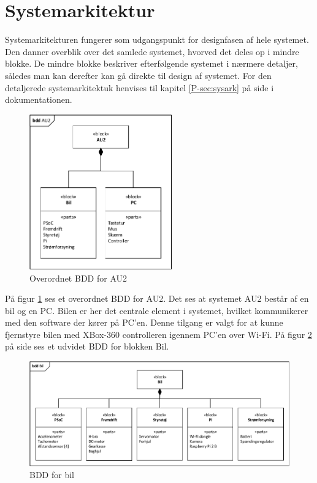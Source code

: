 \section{Systemarkitektur} \label{ch:Systemarkitektur}

Systemarkitekturen fungerer som udgangspunkt for designfasen af hele systemet.
Den danner overblik over det samlede systemet, hvorved det deles op i mindre blokke. 
De mindre blokke beskriver efterfølgende systemet i nærmere detaljer, således man kan derefter kan gå direkte til design af systemet. For den detaljerede systemarkitektuk henvises til kapitel \ref{P-sec:sysark}  på side \pageref{P-sec:sysark} i dokumentationen.

\begin{figure}[h]
\centering
\includegraphics[width=0.55\textwidth]{../fig/diagrammer/bdd_au2.pdf}
\caption{Overordnet BDD for AU2}
\label{fig:bdd_au2}
\end{figure}

På figur \ref{fig:bdd_au2} ses et overordnet BDD for AU2. 
Det ses at systemet AU2 består af en bil og en PC. 
Bilen er her det centrale element i systemet, hvilket kommunikerer med den software der kører på PC'en. 
Denne tilgang er valgt for at kunne fjernstyre bilen med XBox-360 controlleren igennem PC'en over Wi-Fi. På figur \ref{fig:bdd_bil} på side \pageref{fig:bdd_bil} ses et udvidet BDD for blokken Bil.  

\clearpage

\begin{landscape}

\begin{figure}
\centering
\includegraphics[width=\linewidth]{../fig/diagrammer/bil/bdd_bil.pdf}
\caption{BDD for bil}
\label{fig:bdd_bil}
\end{figure}
\end{landscape}


